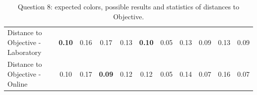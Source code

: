 \begin{table}[H]
{\begin{tabular}{lccccccccccccc}
    \multicolumn{4}{l}{Distance to Objective - Laboratory}                                                                                           & \multicolumn{1}{|c}{\textbf{0.10}}       & \multicolumn{1}{c|}{0.16}    & \multicolumn{1}{|c}{0.17}       & \multicolumn{1}{c|}{0.13}    & \multicolumn{1}{|c}{\textbf{0.10}}       & \multicolumn{1}{c|}{0.05}    & \multicolumn{1}{|c}{0.13}       & \multicolumn{1}{c|}{0.09}    & \multicolumn{1}{|c}{0.13}       & \multicolumn{1}{c|}{0.09}    \\
    \multicolumn{4}{l}{Distance to Objective - Online}                                                                                               & \multicolumn{1}{|c}{0.10}        & \multicolumn{1}{c|}{0.17}    & \multicolumn{1}{|c}{\textbf{0.09}}        & \multicolumn{1}{c|}{0.12}    & \multicolumn{1}{|c}{0.12}       & \multicolumn{1}{c|}{0.05}    & \multicolumn{1}{|c}{0.14}        & \multicolumn{1}{c|}{0.07}    & \multicolumn{1}{|c}{0.16}       & \multicolumn{1}{c|}{0.07}    \\ \hline
    \end{tabular}}
  \caption[Question 8, with expected Results.]{Question 8: expected colors, possible results and statistics of distances to Objective.}
  \label{table:lab_q8_expected}
\end{table}
%
